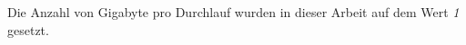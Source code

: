Die Anzahl von Gigabyte pro Durchlauf wurden in dieser Arbeit auf dem Wert \emph{1} gesetzt.

%
%
%
%
%
%
%
%
